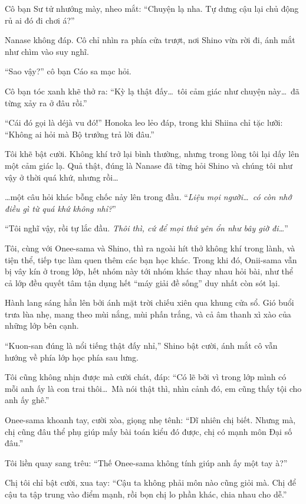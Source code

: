 \documentclass[../main.tex]{subfiles}
\begin{document}
Cô bạn Sư tử nhướng mày, nheo mắt: ``Chuyện lạ nha. Tự dưng cậu lại chủ động rủ ai đó đi chơi á?''

Nanase không đáp. Cô chỉ nhìn ra phía cửa trượt, nơi Shino vừa rời đi, ánh mắt như chìm vào suy nghĩ.

``Sao vậy?'' cô bạn Cáo sa mạc hỏi.

Cô bạn tóc xanh khẽ thở ra: ``Kỳ lạ thật đấy\dots\ tôi cảm giác như chuyện này\dots\ đã từng xảy ra ở đâu rồi.''

``Cái đó gọi là déjà vu đó!'' Honoka leo lẻo đáp, trong khi Shiina chỉ tặc lưỡi: ``Không ai hỏi mà Bộ trưởng trả lời đâu.''

Tôi khẽ bật cười. Không khí trở lại bình thường, nhưng trong lòng tôi lại dấy lên một cảm giác lạ. Quả thật, đúng là Nanase đã từng hỏi Shino và chúng tôi như vậy ở thời quá khứ, nhưng rồi\dots

\dots một câu hỏi khác bỗng chốc nảy lên trong đầu. ``\textit{Liệu mọi người\dots\ có còn nhớ điều gì từ quá khứ không nhỉ?}''

``Tôi nghĩ vậy, rồi tự lắc đầu. \textit{Thôi thì, cứ để mọi thứ yên ổn như bây giờ đi\dots}''

\ct

Tôi, cùng với Onee-sama và Shino, thì ra ngoài hít thở không khí trong lành, và tiện thể, tiếp tục làm quen thêm các bạn học khác. Trong khi đó, Onii-sama vẫn bị vây kín ở trong lớp, hết nhóm này tới nhóm khác thay nhau hỏi bài, như thể cả lớp đều quyết tâm tận dụng hết ``máy giải đề sống'' duy nhất còn sót lại.

Hành lang sáng hẳn lên bởi ánh mặt trời chiếu xiên qua khung cửa sổ. Gió buổi trưa lùa nhẹ, mang theo mùi nắng, mùi phấn trắng, và cả âm thanh xì xào của những lớp bên cạnh.

``Kuon-san đúng là nổi tiếng thật đấy nhỉ,'' Shino bật cười, ánh mắt cô vẫn hướng về phía lớp học phía sau lưng.

Tôi cũng không nhịn được mà cười chát, đáp: ``Có lẽ bởi vì trong lớp mình có mỗi anh ấy là con trai thôi\dots\ Mà nói thật thì, nhìn cảnh đó, em cũng thấy tội cho anh ấy ghê.''

Onee-sama khoanh tay, cười xòa, giọng nhẹ tênh: ``Dĩ nhiên chị biết. Nhưng mà, chị cũng đâu thể phụ giúp mấy bài toán kiểu đó được, chị có mạnh môn Đại số đâu.''

Tôi liền quay sang trêu: ``Thế Onee-sama không tính giúp anh ấy một tay à?''

Chị tôi chỉ bật cười, xua tay: ``Cậu ta không phải môn nào cũng giỏi mà. Chị để cậu ta tập trung vào điểm mạnh, rồi bọn chị lo phần khác, chia nhau cho dễ.''
\end{document}
